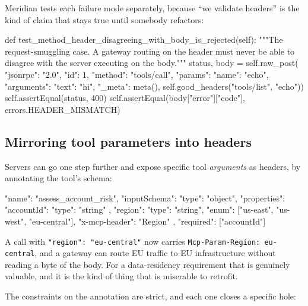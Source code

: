 Meridian tests each failure mode separately, because ``we validate headers'' is
the kind of claim that stays true until somebody refactors:

\begin{py}
def test_method_header_disagreeing_with_body_is_rejected(self):
    """The request-smuggling case. A gateway routing on the header must
    never be able to disagree with the server executing on the body."""
    status, body = self.raw_post(
        {"jsonrpc": "2.0", "id": 1, "method": "tools/call",
         "params": {"name": "echo", "arguments": {"text": "hi"},
                    "_meta": meta()}},
        self.good_headers("tools/list", "echo"))
    self.assertEqual(status, 400)
    self.assertEqual(body["error"]["code"], errors.HEADER_MISMATCH)
\end{py}

\subsection{Mirroring tool parameters into headers}

Servers can go one step further and expose specific tool \emph{arguments} as
headers, by annotating the tool's schema:

\begin{wire}
{
  "name": "assess_account_risk",
  "inputSchema": {
    "type": "object",
    "properties": {
      "accountId": { "type": "string" },
      "region": {
        "type": "string",
        "enum": ["us-east", "us-west", "eu-central"],
        "x-mcp-header": "Region"
      }
    },
    "required": ["accountId"]
  }
}
\end{wire}

A call with \texttt{"region": "eu-central"} now carries
\texttt{Mcp-Param-Region: eu-central}, and a gateway can route EU traffic to EU
infrastructure without reading a byte of the body. For a data-residency
requirement that is genuinely valuable, and it is the kind of thing that is
miserable to retrofit.

The constraints on the annotation are strict, and each one closes a specific
hole:

